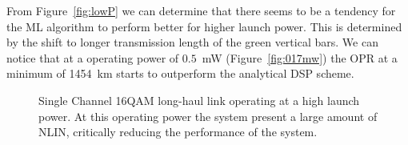  From Figure~\ref{fig:lowP} we can determine that there seems to be a tendency for the ML algorithm to perform better for higher launch power. This is determined by the shift to longer transmission length of the green vertical bars. We can notice that at a operating power of $0.5$~mW (Figure~\ref{fig:017mw}) the OPR at a minimum of 1454~km starts to outperform the analytical DSP scheme.
  
\begin{figure}[h]
  \centering
\qquad
{}       
  \caption{Single Channel 16QAM long-haul link operating at a high launch power. At this operating power the system present a large amount of NLIN, critically reducing the performance of the system. }                                                                                                                                                                                                                                                                                                                                                                                                                                                                                                                                                                                                                                                                                                                                                                                                                                                                                                                                                                                                                                                                                                                                                                                                                                                                                                                                                                                                                                                                                                                                                                                                                                                                                                                                                                                                                                                                                                                                                                                                                                                                                                                                                                                                                                                                                                                                                                                                                                                                             
\end{figure}
